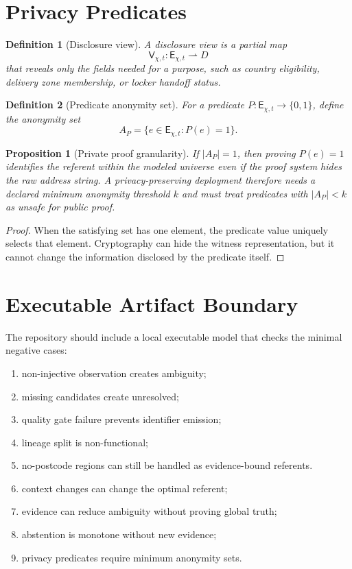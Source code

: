 \documentclass[11pt]{article}
\newtheorem{definition}{Definition}
\newtheorem{proposition}{Proposition}
\newcommand{\Ent}{\mathsf{E}}
\newcommand{\View}{\mathsf{V}}
\begin{document}
\section{Privacy Predicates}

\begin{definition}[Disclosure view]
A disclosure view is a partial map
\[
\View_{\chi,t}:\Ent_{\chi,t}\rightharpoonup D
\]
that reveals only the fields needed for a purpose, such as country eligibility,
delivery zone membership, or locker handoff status.
\end{definition}

\begin{definition}[Predicate anonymity set]
For a predicate \(P:\Ent_{\chi,t}\to\{0,1\}\), define the anonymity set
\[
A_P=\{e\in \Ent_{\chi,t}:P(e)=1\}.
\]
\end{definition}

\begin{proposition}[Private proof granularity]
If \(|A_P|=1\), then proving \(P(e)=1\) identifies the referent within the
modeled universe even if the proof system hides the raw address string. A
privacy-preserving deployment therefore needs a declared minimum anonymity
threshold \(k\) and must treat predicates with \(|A_P|<k\) as unsafe for public
proof.
\end{proposition}

\begin{proof}
When the satisfying set has one element, the predicate value uniquely selects
that element. Cryptography can hide the witness representation, but it cannot
change the information disclosed by the predicate itself.
\end{proof}

\section{Executable Artifact Boundary}

The repository should include a local executable model that checks the minimal
negative cases:

\begin{enumerate}[leftmargin=1.5em]
\item non-injective observation creates ambiguity;
\item missing candidates create unresolved;
\item quality gate failure prevents identifier emission;
\item lineage split is non-functional;
\item no-postcode regions can still be handled as evidence-bound referents.
\item context changes can change the optimal referent;
\item evidence can reduce ambiguity without proving global truth;
\item abstention is monotone without new evidence;
\item privacy predicates require minimum anonymity sets.
\end{enumerate}
\end{document}
